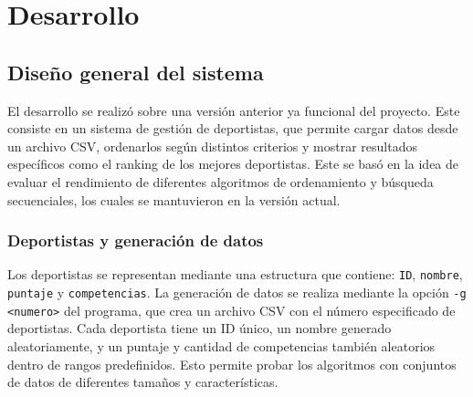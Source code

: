 \chapter{Desarrollo}

\section{Diseño general del sistema}

El desarrollo se realizó sobre una versión anterior ya funcional del proyecto. Este consiste en un sistema de gestión de deportistas, que permite cargar datos desde un archivo CSV, ordenarlos según distintos criterios y mostrar resultados específicos como el ranking de los mejores deportistas. Este se basó en la idea de evaluar el rendimiento de diferentes algoritmos de ordenamiento y búsqueda secuenciales, los cuales se mantuvieron en la versión actual.

\subsection{Deportistas y generación de datos}
Los deportistas se representan mediante una estructura que contiene: \texttt{ID}, \texttt{nombre}, \texttt{puntaje} y \texttt{competencias}. La generación de datos se realiza mediante la opción \texttt{-g <numero>} del programa, que crea un archivo CSV con el número especificado de deportistas. Cada deportista tiene un ID único, un nombre generado aleatoriamente, y un puntaje y cantidad de competencias también aleatorios dentro de rangos predefinidos. Esto permite probar los algoritmos con conjuntos de datos de diferentes tamaños y características.

